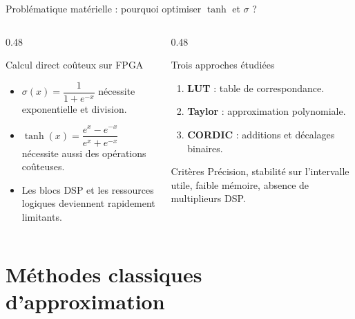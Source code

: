 \documentclass[10pt,aspectratio=169]{beamer}
\begin{document}
\begin{frame}{Problématique matérielle : pourquoi optimiser \(\tanh\) et \(\sigma\) ?}
\begin{columns}[T]
\begin{column}{0.48\textwidth}
  \begin{alertblock}{Calcul direct coûteux sur FPGA}
    \small
    \begin{itemize}
      \item \(\sigma(x)=\dfrac{1}{1+e^{-x}}\) nécessite exponentielle et division.
      \item \(\tanh(x)=\dfrac{e^x-e^{-x}}{e^x+e^{-x}}\) nécessite aussi des opérations coûteuses.
      \item Les blocs DSP et les ressources logiques deviennent rapidement limitants.
    \end{itemize}
  \end{alertblock}
\end{column}
\begin{column}{0.48\textwidth}
  \begin{block}{Trois approches étudiées}
    \begin{enumerate}\small
      \item \textbf{LUT} : table de correspondance.
      \item \textbf{Taylor} : approximation polynomiale.
      \item \textbf{CORDIC} : additions et décalages binaires.
    \end{enumerate}
  \end{block}
  \begin{exampleblock}{Critères}
    \small
    Précision, stabilité sur l'intervalle utile, faible mémoire, absence de multiplieurs DSP.
  \end{exampleblock}
\end{column}
\end{columns}
\vspace{0.25cm}
\centering
{}
\end{frame}

\section{Méthodes classiques d'approximation}
\end{document}
